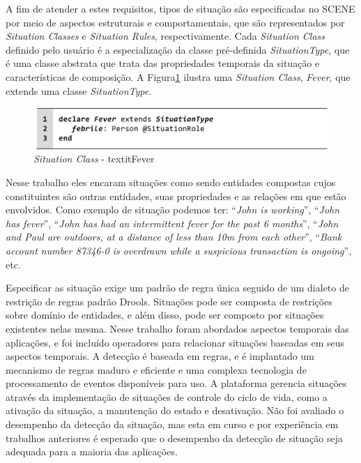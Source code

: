 \documentclass[12pt,a4paper,compsoc]{IEEEtran}
\begin{document}
  A fim de atender a estes requisitos, tipos de situação são especificadas no SCENE por meio de 
  aspectos estruturais e comportamentais, que são representados por  \textit{Situation Classes} e
  \textit{Situation Rules}, respectivamente. Cada \textit{Situation Class} definido pelo usuário é
  a especialização da classe pré-definida \textit{SituationType}, que é uma classe abstrata que
  trata das propriedades temporais da situação e características de composição.
  A Figura\ref{situation-classe-fever} ilustra uma \textit{Situation Class}, \textit{Fever}, que
  extends uma classe \textit{SituationType}.
  
  \begin{figure}[ht]
  \centerline{\includegraphics[scale=.20]{imagens/situation-classe-fever}}
  \caption{\textit{Situation Class} - textit{Fever} \cite{pereira2013rule}}
  \label{situation-classe-fever}
  \end{figure}

  Nesse trabalho eles encaram situações como sendo entidades compostas cujos constituintes são
  outras entidades, suas propriedades e as relações em que estão envolvidos. Como exemplo de
  situação podemos ter: ``\textit{John is working}'', ``\textit{John has fever}'', 
  ``\textit{John has had an intermittent fever for the past 6 months}'', 
  ``\textit{John and Paul are outdoors, at a distance of less than 10m from each other}'',
  ``\textit{Bank account number 87346-0 is overdrawn while a suspicious transaction is ongoing}'',
  etc.

  Especificar as situação exige um padrão de regra única seguido de um dialeto de restrição de
  regras padrão Drools. Situações pode ser composta de restrições sobre domínio de entidades, e
  além disso, pode ser composto por situações existentes nelas mesma. Nesse trabalho foram
  abordados aspectos temporais das aplicações, e foi incluído operadores para relacionar situações
  baseadas em seus aspectos temporais. A detecção é baseada em regras, e é implantado um mecanismo
  de regras maduro e eficiente e uma complexa tecnologia de processamento de eventos disponíveis
  para uso. A plataforma gerencia situações através da implementação de situações de controle do
  ciclo de vida, como a ativação da situação, a manutenção do estado e desativação. Não foi
  avaliado o desempenho da detecção da situação, mas esta em curso e por experiência em trabalhos
  anteriores é esperado que o desempenho da detecção de situação seja adequada para a maioria das
  aplicações.
\end{document}
